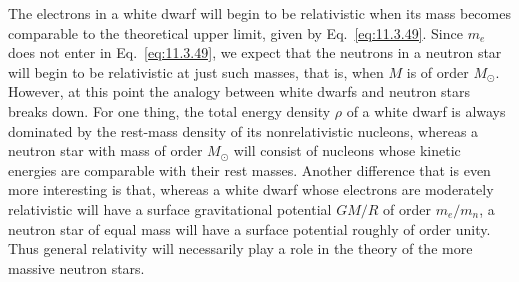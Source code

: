 The electrons in a white dwarf will begin to be relativistic when its mass
becomes comparable to the theoretical upper limit, given by
Eq.~\eqref{eq:11.3.49}. Since \(m_e\) does not enter in
Eq.~\eqref{eq:11.3.49}, we expect that the neutrons in a neutron star will
begin to be relativistic at just such masses, that is, when \(M\) is of order
\(M_\odot\). However, at this point the analogy between white dwarfs and
neutron stars breaks down. For one thing, the total energy density \(\rho\) of
a white dwarf is always dominated by the rest-mass density of its
nonrelativistic nucleons, whereas a neutron star with mass of order
\(M_\odot\) will consist of nucleons whose kinetic energies are comparable
with their rest masses. Another difference that is even more interesting is
that, whereas a white dwarf whose electrons are moderately relativistic will
have a surface gravitational potential \(GM/R\) of order \(m_e/m_n\), a
neutron star of equal mass will have a surface potential roughly of order
unity. Thus general relativity will necessarily play a role in the theory of
the more massive neutron stars.

